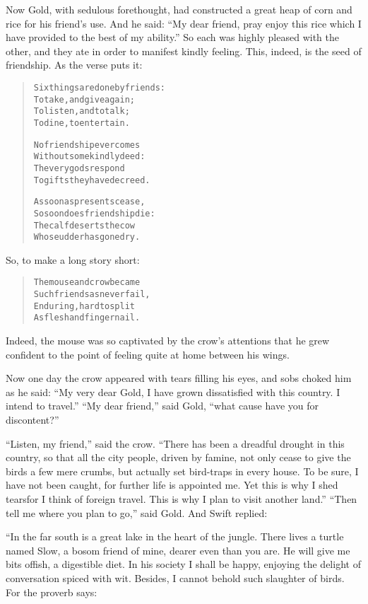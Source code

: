 \documentclass[article, twoside, 14pt]{memoir}
\renewenvironment{verbatim}{%
\begin{quote}%
\vskip -10pt%
\begin{alltt}\normalfont\large}{\end{alltt}%
\end{quote}%
\vskip -10pt
} %
\begin{document}
Now Gold, with sedulous forethought, had constructed a great heap
of corn and rice for his friend's use. And he said:
``My dear friend, pray enjoy this rice which I have provided to the best of my ability.''
So each was highly pleased with the other, and they ate in order to
manifest kindly feeling. This, indeed, is the seed of friendship.
As the verse puts it:

\begin{verbatim}
Six things are done by friends:
    To take, and give again;
To listen, and to talk;
    To dine, to entertain.

No friendship ever comes
    Without some kindly deed:
The very gods respond
    To gifts they have decreed.

As soon as presents cease,
    So soon does friendship die:
The calf deserts the cow
    Whose udder has gone dry.
\end{verbatim}
So, to make a long story short:

\begin{verbatim}
The mouse and crow became
    Such friends as never fail,
Enduring, hard to split
    As flesh and finger nail.
\end{verbatim}
Indeed, the mouse was so captivated by the crow's attentions that
he grew confident to the point of feeling quite at home between his
wings.

Now one day the crow appeared with tears filling his eyes, and sobs
choked him as he said:
``My very dear Gold, I have grown dissatisfied with this country. I intend to travel.''
``My dear friend,'' said Gold,
``what cause have you for discontent?''

``Listen, my friend,'' said the crow.
``There has been a dreadful drought in this country, so that all the city people, driven by famine, not only cease to give the birds a few mere crumbs, but actually set bird-traps in every house. To be sure, I have not been caught, for further life is appointed me. Yet this is why I shed tears{\textemdash}for I think of foreign travel. This is why I plan to visit another land.''
``Then tell me where you plan to go,'' said Gold. And Swift
replied:

“In the far south is a great lake in the heart of the jungle. There
lives a turtle named Slow, a bosom friend of mine, dearer even than
you are. He will give me bits offish, a digestible diet. In his
society I shall be happy, enjoying the delight of conversation
spiced with wit. Besides, I cannot behold such slaughter of birds.
For the proverb says:
\end{document}
